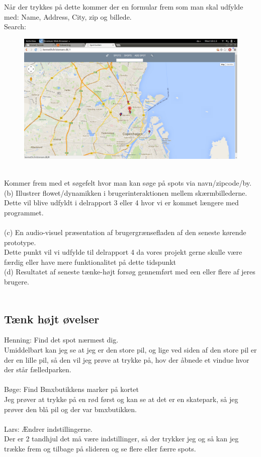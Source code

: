 \documentclass[12pt]{article}
\begin{document}
Når der trykkes på dette kommer der en formular frem som man skal udfylde med: Name, Address, City, zip og billede.\\
\pagebreak
Search: 
\begin{figure}[h]
\includegraphics[scale = 0.21]{Search}
\end{figure}\\
Kommer frem med et søgefelt hvor man kan søge på spots via navn/zipcode/by.\\

(b) Illustrer flowet/dynamikken i brugerinteraktionen mellem skærmbillederne.\\
Dette vil blive udfyldt i delrapport 3 eller 4 hvor vi er kommet længere med programmet.\\\\
(c) En audio-visuel præsentation af brugergrænsefladen af den seneste kørende prototype.\\
Dette punkt vil vi udfylde til delrapport 4 da vores projekt gerne skulle være færdig eller have mere funktionalitet på dette tidspunkt\\
(d) Resultatet af seneste tænke-højt forsøg gennemført med een eller flere af jeres brugere.\\\\
\subsection{Tænk højt øvelser}
Henning: Find det spot nærmest dig.\\
Umiddelbart kan jeg se at jeg er den store pil, og lige ved siden af den store pil er der en lille pil, så den vil jeg prøve at trykke på, hov der åbnede et vindue hvor der står fælledparken.\\\\
Bøge: Find Bmxbutikkens marker på kortet\\
Jeg prøver at trykke på en rød først og kan se at det er en skatepark, så jeg prøver den blå pil og der var bmxbutikken.\\\\
Lars: Ændrer indstillingerne.\\
Der er 2 tandhjul det må være indstillinger, så der trykker jeg og så kan jeg trække frem og tilbage på slideren og se flere eller færre spots.\\\\
\end{document}
